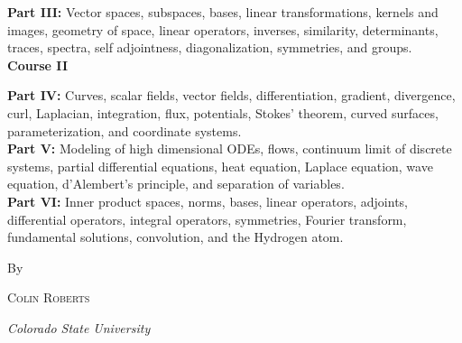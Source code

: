 \begin{titlepage}
    \noindent\textbf{Part III:} Vector spaces, subspaces, bases, linear transformations, kernels and images, geometry of space, linear operators, inverses, similarity, determinants, traces, spectra, self adjointness, diagonalization, symmetries, and groups.   \\%

    \vspace*{1cm}
    \noindent\textbf{\large{Course II}}

	\noindent\textbf{Part IV:} Curves, scalar fields, vector fields, differentiation, gradient, divergence, curl, Laplacian, integration, flux, potentials, Stokes' theorem, curved surfaces, parameterization, and coordinate systems.\\

    \noindent\textbf{Part V:} Modeling of high dimensional ODEs, flows, continuum limit of discrete systems, partial differential equations, heat equation, Laplace equation, wave equation, d'Alembert's principle, and separation of variables.\\

    \noindent\textbf{Part VI:} Inner product spaces, norms, bases, linear operators, adjoints, differential operators, integral operators, symmetries, Fourier transform, fundamental solutions, convolution, and the Hydrogen atom.


	\vspace*{3\baselineskip} %


	By

	\vspace{0.5\baselineskip} %

	{\scshape\Large Colin Roberts \\} %

	\vspace{0.5\baselineskip} %

	\textit{Colorado State University} %

	\vfill %



\end{titlepage}
